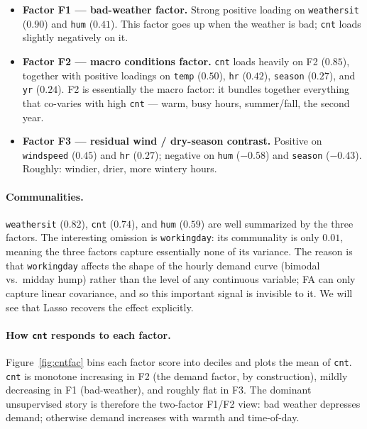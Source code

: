\documentclass[11pt]{article}
\begin{document}
\begin{itemize}
\item \textbf{Factor F1 --- bad-weather factor.}
      Strong positive loading on \texttt{weathersit} ($0.90$) and
      \texttt{hum} ($0.41$). This factor goes up when the weather
      is bad; \texttt{cnt} loads slightly negatively on it.
\item \textbf{Factor F2 --- macro conditions factor.}
      \texttt{cnt} loads heavily on F2 ($0.85$), together with
      positive loadings on \texttt{temp} ($0.50$), \texttt{hr}
      ($0.42$), \texttt{season} ($0.27$), and \texttt{yr} ($0.24$).
      F2 is essentially the macro factor: it bundles together everything that co-varies with high \texttt{cnt}
      --- warm, busy hours, summer/fall, the second year.
\item \textbf{Factor F3 --- residual wind / dry-season contrast.}
      Positive on \texttt{windspeed} ($0.45$) and \texttt{hr}
      ($0.27$); negative on \texttt{hum} ($-0.58$) and
      \texttt{season} ($-0.43$). Roughly: windier, drier, more
      wintery hours.
\end{itemize}

\paragraph{Communalities.}
\texttt{weathersit} ($0.82$), \texttt{cnt} ($0.74$), and
\texttt{hum} ($0.59$) are well summarized by the three factors.
The interesting omission is \texttt{workingday}: its communality is
only $0.01$, meaning the three factors capture essentially none of
its variance. The reason is that \texttt{workingday} affects the
shape of the hourly demand curve (bimodal vs.\ midday hump)
rather than the level of any continuous variable; FA can only
capture linear covariance, and so this important signal is
invisible to it. We will see that Lasso recovers the effect explicitly.

\paragraph{How \texttt{cnt} responds to each factor.}
Figure~\ref{fig:cntfac} bins each factor score into deciles and
plots the mean of \texttt{cnt}. \texttt{cnt} is monotone
increasing in F2 (the demand factor, by construction),
mildly decreasing in F1 (bad-weather), and roughly flat in F3.
The dominant unsupervised story is therefore the two-factor F1/F2
view: bad weather depresses demand; otherwise demand increases with
warmth and time-of-day.
\end{document}
